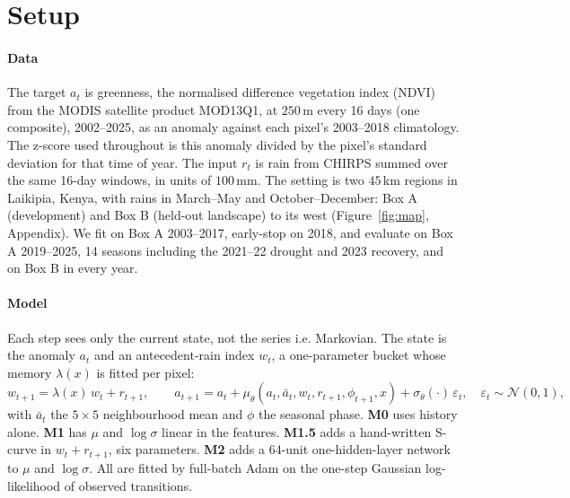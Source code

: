 \documentclass{article}
\begin{document}
\section{Setup}
\paragraph{Data} The target $a_t$ is greenness, the normalised difference vegetation index (NDVI) from the MODIS satellite product MOD13Q1, at $250$\,m every 16 days (one composite), 2002--2025, as an anomaly against each pixel's 2003--2018 climatology. The z-score used throughout is this anomaly divided by the pixel's standard deviation for that time of year. The input $r_t$ is rain from CHIRPS summed over the same 16-day windows, in units of $100$\,mm. The setting is two $45$\,km regions in Laikipia, Kenya, with rains in March--May and October--December: Box A (development) and Box B (held-out landscape) to its west (Figure~\ref{fig:map}, Appendix). We fit on Box A 2003--2017, early-stop on 2018, and evaluate on Box A 2019--2025, 14 seasons including the 2021--22 drought and 2023 recovery, and on Box B in every year.

\paragraph{Model} Each step sees only the current state, not the series i.e. Markovian. The state is the anomaly $a_t$ and an antecedent-rain index $w_t$, a one-parameter bucket whose memory $\lambda(x)$ is fitted per pixel:
\begin{equation}
w_{t+1} = \lambda(x)\,w_t + r_{t+1}, \qquad
a_{t+1} = a_t + \mu_\theta(a_t, \bar a_t, w_t, r_{t+1}, \phi_{t+1}, x) + \sigma_\theta(\cdot)\,\varepsilon_t,\quad \varepsilon_t\sim\mathcal N(0,1),
\label{eq:model}
\end{equation}
with $\bar a_t$ the $5\times5$ neighbourhood mean and $\phi$ the seasonal phase. \textbf{M0} uses history alone. \textbf{M1} has $\mu$ and $\log\sigma$ linear in the features. \textbf{M1.5} adds a hand-written S-curve in $w_t+r_{t+1}$, six parameters. \textbf{M2} adds a 64-unit one-hidden-layer network to $\mu$ and $\log\sigma$. All are fitted by full-batch Adam on the one-step Gaussian log-likelihood of observed transitions.
\end{document}
